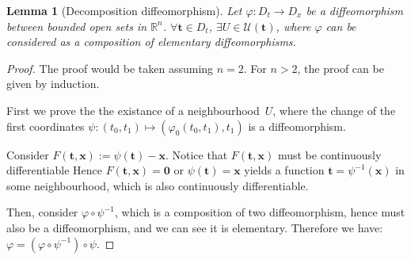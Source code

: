 \documentclass[openany]{book}
\theoremstyle{plain}
\newtheorem{lemma}{Lemma} %
\theoremstyle{definition}
\newcommand*{\bv}{\boldsymbol} %
\begin{document}
\begin{lemma}[Decomposition diffeomorphism]
	Let $\varphi \colon D_t \to D_x$ be a diffeomorphism between bounded open sets in $\mathbb R^n$. 
	$\forall \bv t \in D_t$, $\exists U \in \mathscr U(\bv t)$, where $\varphi$ can be considered as a composition of elementary diffeomorphisms.
\end{lemma}
\begin{proof}
	The proof would be taken assuming $n = 2$. For $n > 2$, the proof can be given by induction.

	First we prove the the existance of a neighbourhood~$U$, where the change of the first coordinates $\psi \colon (t_0, t_1) \mapsto (\varphi_0(t_0, t_1), t_1)$ is a diffeomorphism.

	Consider $F(\bv t, \bv x) := \psi(\bv t) - \bv x$. 
	Notice that $F(\bv t, \bv x)$ must be continuously differentiable
	Hence $F(\bv t, \bv x) = \bv 0 $ or $\psi(\bv t) = \bv x$ yields a function $\bv t = \psi^{-1}(\bv x)$ in some neighbourhood, which is also continuously differentiable.

	Then, consider $\varphi \circ \psi^{-1}$, which is a composition of two diffeomorphism, hence must also be a diffeomorphism, and we can see it is elementary. 
	Therefore we have: $\varphi = (\varphi \circ \psi^{-1}) \circ \psi$.
\end{proof}
\end{document}
